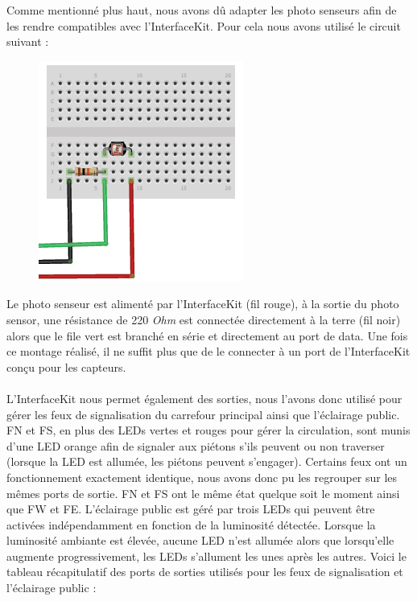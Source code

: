 Comme mentionné plus haut, nous avons dû adapter les photo senseurs afin de les rendre compatibles avec l’InterfaceKit. Pour cela nous avons utilisé le circuit suivant :
\begin{figure}[H]
    \begin{center}
        \includegraphics[scale=0.4,keepaspectratio]{img/circuit-photo-senseurs}
    \end{center}
\end{figure}
Le photo senseur est alimenté par l’InterfaceKit (fil rouge), à la sortie du photo sensor, une résistance de 220 \textit{Ohm} est connectée directement à la terre (fil noir) alors que le file vert est branché en série et directement au port de data. Une fois ce montage réalisé, il ne suffit plus que de le connecter à un port de l’InterfaceKit conçu pour les capteurs.\\\\

L’InterfaceKit nous permet également des sorties, nous l’avons donc utilisé pour gérer les feux de signalisation du carrefour principal ainsi que l’éclairage public. FN et FS, en plus des LEDs vertes et rouges pour gérer la circulation, sont munis d’une LED orange afin de signaler aux piétons s’ils peuvent ou non traverser (lorsque la LED est allumée, les piétons peuvent s’engager). Certains feux ont un fonctionnement exactement identique, nous avons donc pu les regrouper sur les mêmes ports de sortie. FN et FS ont le même état quelque soit le moment ainsi que FW et FE.
L’éclairage public est géré par trois LEDs qui peuvent être activées indépendamment en fonction de la luminosité détectée. Lorsque la luminosité ambiante est élevée, aucune LED n’est allumée alors que lorsqu’elle augmente progressivement, les LEDs s’allument les unes après les autres.
Voici le tableau récapitulatif des ports de sorties utilisés pour les feux de signalisation et l’éclairage public :

